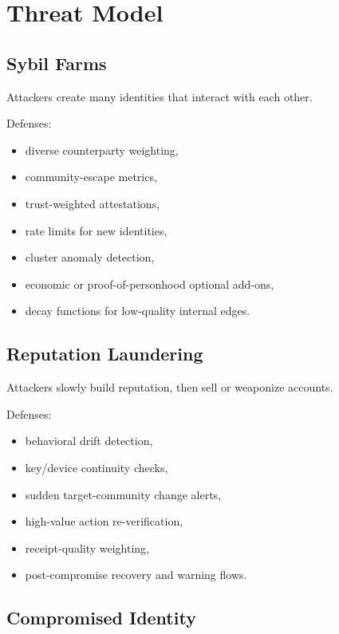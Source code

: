 \documentclass[11pt]{article}
\begin{document}
\section{Threat Model}

\subsection{Sybil Farms}

Attackers create many identities that interact with each other.

Defenses:

\begin{itemize}
    \item diverse counterparty weighting,
    \item community-escape metrics,
    \item trust-weighted attestations,
    \item rate limits for new identities,
    \item cluster anomaly detection,
    \item economic or proof-of-personhood optional add-ons,
    \item decay functions for low-quality internal edges.
\end{itemize}

\subsection{Reputation Laundering}

Attackers slowly build reputation, then sell or weaponize accounts.

Defenses:

\begin{itemize}
    \item behavioral drift detection,
    \item key/device continuity checks,
    \item sudden target-community change alerts,
    \item high-value action re-verification,
    \item receipt-quality weighting,
    \item post-compromise recovery and warning flows.
\end{itemize}

\subsection{Compromised Identity}
\end{document}

